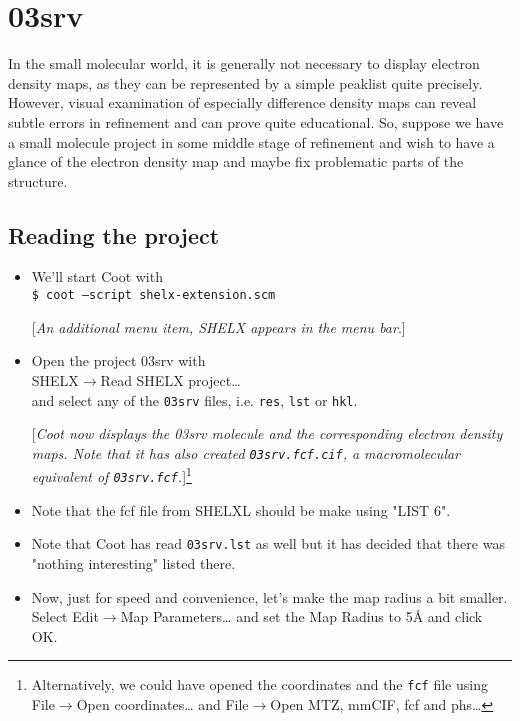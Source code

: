 \documentclass{article}
\begin{document}
\section{03srv}

In the small molecular world, it is generally not necessary to display
electron density maps, as they can be represented by a simple peaklist
quite precisely. However, visual examination of especially difference
density maps can reveal subtle errors in refinement and can prove
quite educational. So, suppose we have a small molecule project in
some middle stage of refinement and wish to have a glance of the
electron density map and maybe fix problematic parts of the structure.

\subsection{Reading the project}
\begin{itemize}
\item We'll start Coot with\\\texttt{\$ coot --script shelx-extension.scm}

  [\textsl{An additional menu item, SHELX appears in the menu bar}.]

\item Open the project 03srv with\\\textsf{SHELX$\to$Read SHELX
    project\ldots}\\and select any of the \texttt{03srv} files, i.e.
  \texttt{res}, \texttt{lst} or \texttt{hkl}.

  [\textsl{Coot now displays the 03srv molecule and the corresponding
    electron density maps. Note that it has also created
    \texttt{03srv.fcf.cif}, a macromolecular equivalent of
    \texttt{03srv.fcf}.}]\footnote{Alternatively, we could have opened
    the coordinates and the \texttt{fcf} file
    using\\\textsf{File$\to$Open coordinates\ldots} and
    \textsf{File$\to$Open MTZ, mmCIF, fcf and phs\ldots}}

\item Note that the fcf file from SHELXL should be make using "LIST
  6".

\item Note that Coot has read \texttt{03srv.lst} as well but it has
  decided that there was "nothing interesting" listed there.

\item Now, just for speed and convenience, let's make the map radius a
  bit smaller. Select \textsf{Edit$\to$Map Parameters\ldots} and set
  the Map Radius to 5{\AA} and click \textsf{OK}.
\end{itemize}
\end{document}
